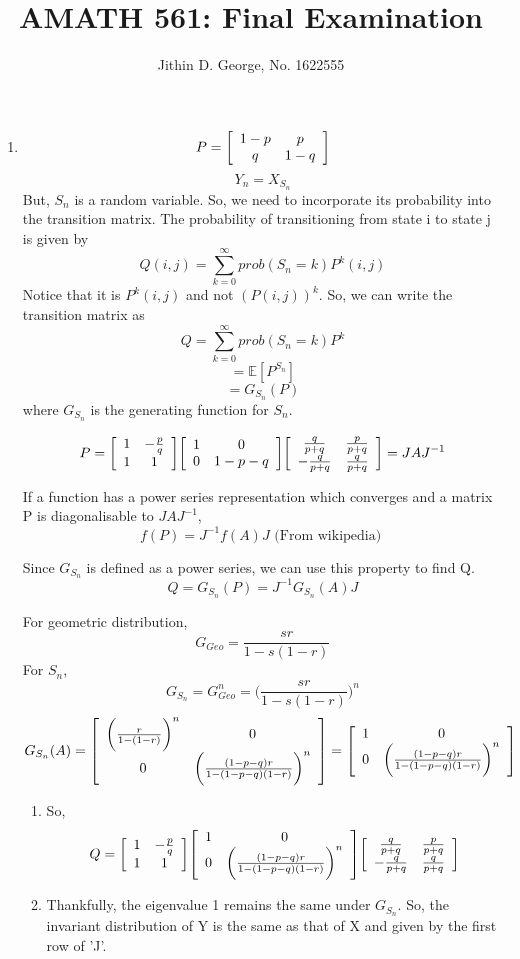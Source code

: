 \documentclass[a4paper,11pt]{article}
\title{AMATH 561: Final Examination}
\author{Jithin D. George, No. 1622555}
\newenvironment{mat}{\left[ \begin{array}{ccccccccccccc}}{\end{array}\right]}
\newcommand\bcm{\begin{mat}}
\newcommand\ecm{\end{mat}}
\begin{document}
\maketitle
\begin{enumerate}


\item
\[P = \bcm 1-p & p \\ q & 1-q\ecm\]
\[Y_n = X_{S_n} \]
But, $S_n$ is a random variable. So, we need to incorporate its probability into the transition matrix. The probability of transitioning from state i to state j is given by
\[Q(i,j) = \sum_{k=0}^\infty prob(S_n =k)P^k(i,j)\]
Notice that it is $P^k(i,j)$ and not $(P(i,j))^k$. So, we can write the transition matrix as
\[Q = \sum_{k=0}^\infty prob(S_n =k)P^k\]
\[ =\mathbb{E}[P^{S_n}]\]
\[ = G_{S_n}(P)\]
where $G_{S_n}$ is the generating function for $S_n$.

\[P =  \bcm 1 & -\frac{p}{q} \\ 1 & 1\ecm \bcm 1 &0\\0 & 1-p-q\ecm   \bcm \frac{q}{p+q} &\frac{p}{p+q}\\ -\frac{q}{p+q} & \frac{q}{p+q}\ecm = JAJ^{-1}\] 
 
If a function has a power series representation which converges and a matrix P is diagonalisable to $JAJ^{-1}$, 
\[f(P) = J^{-1}f(A)J \text{    (From wikipedia)  }\]

Since $G_{S_n}$ is defined as a power series, we can use this property to find Q.
\[ Q = G_{S_n}(P) = J^{-1}G_{S_n}(A)J\]

For geometric distribution,
\[G_{Geo} = \frac{sr}{1-s(1-r)}\]
For $S_n$, 
\[G_{S_n} = G_{Geo}^n = \bigg(\frac{sr}{1-s(1-r)}\bigg)^n\]
\[G_{S_n}(A) = \bcm \bigg(\frac{r}{1-(1-r)}\bigg)^n&0\\ 0 & \bigg(\frac{(1-p-q)r}{1-(1-p-q)(1-r)}\bigg)^n\ecm = \bcm 1 &0\\ 0 & \bigg(\frac{(1-p-q)r}{1-(1-p-q)(1-r)}\bigg)^n\ecm \]
\begin{enumerate}
\item
So,
\[ Q = \bcm 1 & -\frac{p}{q} \\ 1 & 1\ecm  \bcm 1 &0\\ 0 & \bigg(\frac{(1-p-q)r}{1-(1-p-q)(1-r)}\bigg)^n\ecm  \bcm \frac{q}{p+q} &\frac{p}{p+q}\\ -\frac{q}{p+q} & \frac{q}{p+q}\ecm\]
\item

Thankfully, the eigenvalue 1 remains the same under $G_{S_n}$. So, the invariant distribution of Y is the same as that of X and given by the first row of 'J'.


\end{enumerate}
\end{enumerate}
\end{document}
